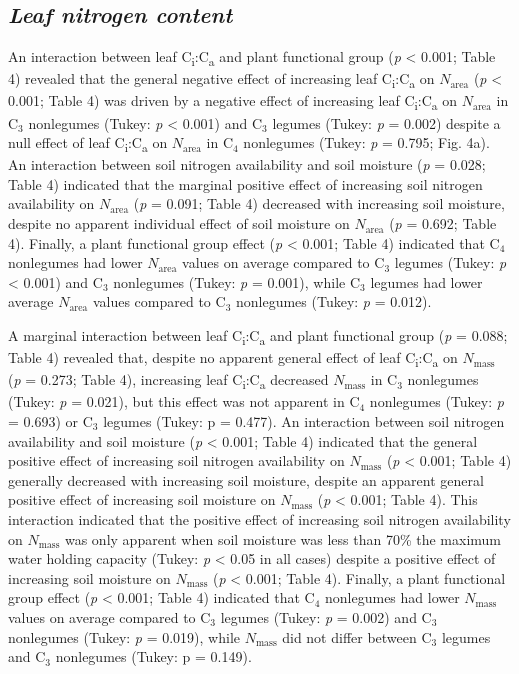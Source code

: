 \subsection{\textit{Leaf nitrogen content}}
\noindent An interaction between leaf C\textsubscript{i}:C\textsubscript{a} and plant functional group (\textit{p} < 0.001; Table 4) revealed that the general negative effect of increasing leaf C\textsubscript{i}:C\textsubscript{a} on $N_\mathrm{area}$ (\textit{p} < 0.001; Table 4) was driven by a negative effect of increasing leaf C\textsubscript{i}:C\textsubscript{a} on $N_\mathrm{area}$ in C$_3$ nonlegumes (Tukey: \textit{p} < 0.001) and C$_3$ legumes (Tukey: \textit{p} = 0.002) despite a null effect of leaf C\textsubscript{i}:C\textsubscript{a} on $N_\mathrm{area}$ in C$_4$ nonlegumes (Tukey: \textit{p} = 0.795; Fig. 4a). An interaction between soil nitrogen availability and soil moisture (\textit{p} = 0.028; Table 4) indicated that the marginal positive effect of increasing soil nitrogen availability on $N_\mathrm{area}$ (\textit{p} = 0.091; Table 4) decreased with increasing soil moisture, despite no apparent individual effect of soil moisture on $N_\mathrm{area}$ (\textit{p} = 0.692; Table 4). Finally, a plant functional group effect (\textit{p} < 0.001; Table 4) indicated that C$_4$ nonlegumes had lower $N_\mathrm{area}$ values on average compared to C$_3$ legumes (Tukey: \textit{p} < 0.001) and C$_3$ nonlegumes (Tukey: \textit{p} = 0.001), while C$_3$ legumes had lower average $N_\mathrm{area}$ values compared to C$_3$ nonlegumes (Tukey: \textit{p} = 0.012).

A marginal interaction between leaf C\textsubscript{i}:C\textsubscript{a} and plant functional group (\textit{p} = 0.088; Table 4) revealed that, despite no apparent general effect of leaf C\textsubscript{i}:C\textsubscript{a} on $N_\mathrm{mass}$ (\textit{p} = 0.273; Table 4), increasing leaf C\textsubscript{i}:C\textsubscript{a} decreased $N_\mathrm{mass}$ in C$_3$ nonlegumes (Tukey: \textit{p} = 0.021), but this effect was not apparent in C$_4$ nonlegumes (Tukey: \textit{p} = 0.693) or C$_3$ legumes (Tukey: p = 0.477). An interaction between soil nitrogen availability and soil moisture (\textit{p} < 0.001; Table 4) indicated that the general positive effect of increasing soil nitrogen availability on $N_\mathrm{mass}$ (\textit{p} < 0.001; Table 4) generally decreased with increasing soil moisture, despite an apparent general positive effect of increasing soil moisture on $N_\mathrm{mass}$ (\textit{p} < 0.001; Table 4). This interaction indicated that the positive effect of increasing soil nitrogen availability on $N_\mathrm{mass}$ was only apparent when soil moisture was less than 70\% the maximum water holding capacity (Tukey: \textit{p} < 0.05 in all cases) despite a positive effect of increasing soil moisture on $N_\mathrm{mass}$ (\textit{p} < 0.001; Table 4). Finally, a plant functional group effect (\textit{p} < 0.001; Table 4) indicated that C$_4$ nonlegumes had lower $N_\mathrm{mass}$ values on average compared to C$_3$ legumes (Tukey: \textit{p} = 0.002) and C$_3$ nonlegumes (Tukey: \textit{p} = 0.019), while $N_\mathrm{mass}$ did not differ between C$_3$ legumes and C$_3$ nonlegumes (Tukey: p = 0.149).

